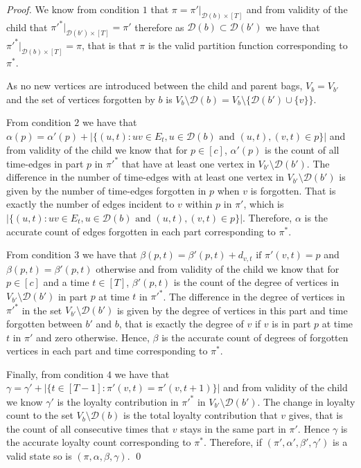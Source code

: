 \documentclass[runningheads]{llncs}
\begin{document}
\begin{proof}
We know from condition $1$ that $\pi=\pi'| _{\mathcal{D}(b)\times [T]}$ and from validity of the child that $\pi'^*|_{\mathcal{D}(b')\times [T]}=\pi'$ therefore as $\mathcal{D}(b) \subset \mathcal{D}(b')$ we have that $\pi'^*|_{\mathcal{D}(b)\times [T]}=\pi$, that is that $\pi$ is the valid partition function corresponding to $\pi^*$.

 As no new vertices are introduced between the child and parent bags, $V_b=V_{b'}$ and the set of vertices forgotten by $b$ is $V_b\setminus\mathcal{D}(b)=V_b\setminus\{\mathcal{D}(b')\cup \{v\}\}$.

From condition $2$ we have that $\alpha(p) =\alpha'(p) +|\{(u,t):uv \in E_t, u \in \mathcal{D}(b) \text{ and } (u,t),(v,t) \in p \}|$ and from validity of the child we know that for $p \in [c]$, $\alpha'(p)$ is the count of all time-edges in part $p$ in $\pi'^*$ that have at least one vertex in $V_{b'}\setminus\mathcal{D}(b')$. 
The difference in the number of time-edges with at least one vertex in $V_{b'}\setminus\mathcal{D}(b')$ is given by the number of time-edges forgotten in $p$ when $v$ is forgotten. That is exactly the number of edges incident to $v$ within $p$ in $\pi'$, which is $|\{(u,t):uv \in E_t, u \in \mathcal{D}(b) \text{ and } (u,t),(v,t) \in p \}|$.
Therefore, $\alpha$ is the accurate count of edges forgotten in each part corresponding to $\pi^*$.

From condition $3$ we have that $\beta(p,t) = \beta'(p,t) + d_{v,t} \text{ if } \pi'(v,t)=p$ and $\beta(p,t)=\beta'(p,t)$ otherwise and from validity of the child we know that for $p \in [c]$ and a time $t \in [T]$, $\beta'(p,t)$ is the count of the degree of vertices in $V_{b'}\setminus\mathcal{D}(b')$ in part $p$ at time $t$ in $\pi'^*$.
The difference in the degree of vertices in $\pi'^*$ in the set $V_{b'}\setminus\mathcal{D}(b')$ is given by the degree of vertices in this part and time forgotten between $b'$ and $b$, that is exactly the degree of $v$ if $v$ is in part $p$ at time $t$ in $\pi'$ and zero otherwise. Hence, $\beta$ is the accurate count of degrees of forgotten vertices in each part and time corresponding to $\pi^*$.

Finally, from condition $4$ we have that $\gamma = \gamma' + |\{t \in [T-1]:\pi'(v,t)=\pi'(v,t+1)\}|$ and from validity of the child we know $\gamma'$ is the loyalty contribution in $\pi'^*$ in $V_{b'}\setminus\mathcal{D}(b')$.
The change in loyalty count to the set $V_{b}\setminus\mathcal{D}(b)$ is the total loyalty contribution that $v$ gives, that is the count of all consecutive times that $v$ stays in the same part in $\pi'$. Hence $\gamma$ is the accurate loyalty count corresponding to $\pi^*$.
Therefore, if $(\pi',\alpha',\beta',\gamma')$ is a valid state so is $(\pi,\alpha,\beta,\gamma)$.  
\qed
\end{proof}
\end{document}

